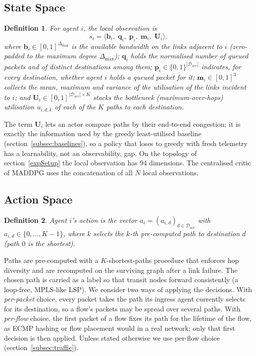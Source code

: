 \documentclass[10pt,journal,comsoc]{IEEEtran}
\newtheorem{definition}{Definition}
\begin{document}
\subsection{State Space}
\begin{definition}
  \label{local_state}
  For agent $i$, the local observation is
  \[
    s_i = \big\langle \mathbf{b}_i,\; \mathbf{q}_i,\; \mathbf{p}_i,\; \mathbf{m}_i,\; \mathbf{U}_i \big\rangle,
  \]
  where $\mathbf{b}_i \in [0,1]^{\Delta_{\max}}$ is the available bandwidth on the links adjacent to $i$ (zero-padded to the maximum degree $\Delta_{\max}$); $\mathbf{q}_i$ holds the normalised number of queued packets and of distinct destinations among them; $\mathbf{p}_i \in \{0,1\}^{|\mathcal{D}_{\text{acc}}|}$ indicates, for every destination, whether agent $i$ holds a queued packet for it; $\mathbf{m}_i \in [0,1]^{3}$ collects the mean, maximum and variance of the utilisation of the links incident to $i$; and $\mathbf{U}_i \in [0,1]^{|\mathcal{D}_{\text{acc}}|\times K}$ stacks the bottleneck (maximum-over-hops) utilisation $u_{i,d,k}$ of each of the $K$ paths to each destination.
\end{definition}

The term $\mathbf{U}_i$ lets an actor compare paths by their end-to-end congestion; it is exactly the information used by the greedy least-utilised baseline (section~\ref{subsec:baselines}), so a policy that loses to greedy with fresh telemetry has a learnability, not an observability, gap. On the topology of section~\ref{expSetup} the local observation has 94 dimensions. The centralised critic of MADDPG uses the concatenation of all $N$ local observations.

\subsection{Action Space}
\begin{definition}
  \label{def:action_space}
  Agent $i$'s action is the vector $a_i = (a_{i,d})_{d \in \mathcal{D}_{\text{acc}}}$ with $a_{i,d} \in \{0,\dots,K-1\}$, where $k$ selects the $k$-th pre-computed path to destination $d$ (path $0$ is the shortest).
\end{definition}

Paths are pre-computed with a $K$-shortest-paths procedure that enforces hop diversity and are recomputed on the surviving graph after a link failure. The chosen path is carried as a label so that transit nodes forward consistently (a loop-free, MPLS-like LSP). We consider two ways of applying the decisions. With \emph{per-packet} choice, every packet takes the path its ingress agent currently selects for its destination, so a flow's packets may be spread over several paths. With \emph{per-flow} choice, the first packet of a flow fixes its path for the lifetime of the flow, as ECMP hashing or flow placement would in a real network; only that first decision is then applied. Unless stated otherwise we use per-flow choice (section~\ref{subsec:traffic}).
\end{document}
